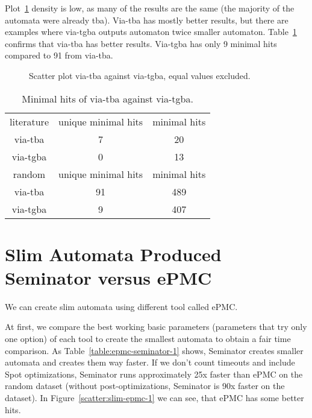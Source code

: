 \documentclass[
	digital,
nolof, nolot
]{fithesis3}
\begin{document}
		Plot~\ref{scatter:tba-tgba} density is low, as many of the results are the same (the majority of the automata were already tba). Via-tba has mostly better results, but there are examples where via-tgba outputs automaton twice smaller automaton. Table~\ref{table:tba-tgba-min-hits} confirms that via-tba has better results. Via-tgba has only 9 minimal hits compared to 91 from via-tba.
		
		\begin{figure}[ht]
			\centering
			
		\caption{Scatter plot via-tba against via-tgba, equal values excluded. }
		\label{scatter:tba-tgba}
		\begin{tikzpicture}
			
		\end{tikzpicture}
		\end{figure}
		
		 
		\begin{table}[ht]
			
			\centering
			\caption{Minimal hits of via-tba against via-tgba.}
			\label{table:tba-tgba-min-hits}
			\begin{tabular}{ |c||c|c| } 
				\hline
				literature&unique minimal hits&minimal hits\\
				\hhline{|===|}
				via-tba&7 & 20\\
				\hline
				via-tgba&0 & 13\\ 
				\hline
				\hline
				random&unique minimal hits&minimal hits\\
				\hhline{|===|}
				via-tba&91 & 489\\
				\hline
				via-tgba&9 & 407\\ 
				\hline
			\end{tabular}
		\end{table}
	\clearpage
		\section{Slim Automata Produced Seminator versus ePMC}
		We can create slim automata using different tool called ePMC.
		
		At first, we compare the best working basic parameters (parameters that try only one option) of each tool to create the smallest automata to obtain a fair time comparison.
		As Table~\ref{table:epmc-seminator-1} shows, Seminator creates smaller automata and creates them way faster. If we don't count timeouts and include Spot optimizations, Seminator runs approximately 25x faster than ePMC on the random dataset (without post-optimizations, Seminator is 90x faster on the dataset). In Figure~\ref{scatter:slim-epmc-1} we can see, that ePMC has some better hits.
	
\end{document}
